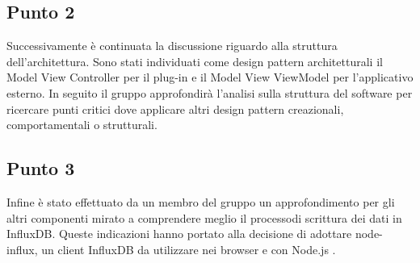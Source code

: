     \subsection{Punto 2}
        Successivamente è continuata la discussione riguardo alla struttura dell'architettura. Sono stati individuati come design pattern architetturali il Model View Controller per il plug-in e il Model View ViewModel per l'applicativo esterno. In seguito il gruppo approfondirà l'analisi sulla struttura del software per ricercare punti critici dove applicare altri design pattern creazionali, comportamentali o strutturali. 
    \subsection{Punto 3}
        Infine è stato effettuato da un membro del gruppo un approfondimento per gli altri componenti mirato a comprendere meglio il processo\glosp di scrittura dei dati in InfluxDB. Queste indicazioni hanno portato alla decisione di adottare node-influx, un client InfluxDB da utilizzare nei browser e con Node.js .